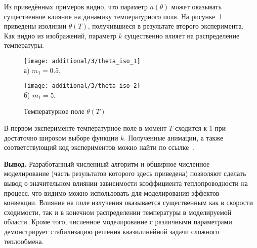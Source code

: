 Из приведённых примеров видно, что параметр $a(\theta)$ может оказывать существенное влияние
на динамику температурного поля.
На рисунке~\ref{fig:4_3:theta_iso_2exp} приведены изолинии $\theta(T)$,
получившиеся в результате второго эксперимента.
Как видно из изображений, параметр $k$ существенно влияет на распределение температуры.
\begin{figure}[h!t]
    \begin{minipage}[b][][b]{0.49\linewidth}
        \centering
        \texttt{[image: additional/3/theta\_iso\_1]} \\ а) $m_1 = 0.5$,
    \end{minipage}
    \hfill
    \begin{minipage}[b][][b]{0.49\linewidth}
        \centering
        \texttt{[image: additional/3/theta\_iso\_2]} \\ б) $m_1 = 5$.
    \end{minipage}
    \caption{Температурное поле $\theta (T)$}
    \label{fig:4_3:theta_iso_2exp}
\end{figure}


В первом эксперименте температурное поле в момент $T$ сходится к $1$
при достаточно широком выборе функции $k$.
Полученные анимации, а также соответствующий код
экспериментов можно найти по ссылке~\cite{mesenev-github}.


\textbf{Вывод.}
Разработанный численный алгоритм и обширное численное моделирование
(часть результатов которого здесь приведена)
позволяют сделать вывод о значительном влиянии зависимости
коэффициента теплопроводности на процесс, что видимо можно
использовать для моделирования эффектов конвекции.
Влияние на поле излучения оказывается существенным как в скорости сходимости,
так и в конечном распределении температуры в моделируемой области.
Кроме того, численное моделирование с различными параметрами
демонстрирует стабилизацию решения квазилинейной задачи сложного теплообмена.



